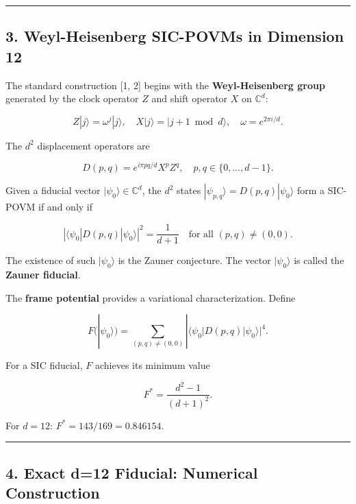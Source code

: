 \begin{center}\rule{0.5\linewidth}{0.5pt}\end{center}

\hypertarget{weyl-heisenberg-sic-povms-in-dimension-12}{%
\subsection{3. Weyl-Heisenberg SIC-POVMs in Dimension
12}\label{weyl-heisenberg-sic-povms-in-dimension-12}}

The standard construction {[}1, 2{]} begins with the
\textbf{Weyl-Heisenberg group} generated by the clock operator \(Z\) and
shift operator \(X\) on \(\mathbb{C}^d\):

\[Z|j\rangle = \omega^j |j\rangle, \quad X|j\rangle = |j+1 \bmod d\rangle, \quad \omega = e^{2\pi i/d}.\]

The \(d^2\) displacement operators are

\[D(p,q) = e^{i\pi pq/d} X^p Z^q, \quad p, q \in \{0, \ldots, d-1\}.\]

Given a fiducial vector \(|\psi_0\rangle \in \mathbb{C}^d\), the \(d^2\)
states \(|\psi_{p,q}\rangle = D(p,q)|\psi_0\rangle\) form a SIC-POVM if
and only if

\[|\langle \psi_0 | D(p,q) | \psi_0 \rangle|^2 = \frac{1}{d+1} \quad \text{for all } (p,q) \neq (0,0).\]

The existence of such \(|\psi_0\rangle\) is the Zauner conjecture. The
vector \(|\psi_0\rangle\) is called the \textbf{Zauner fiducial}.

The \textbf{frame potential} provides a variational characterization.
Define

\[F(|\psi_0\rangle) = \sum_{(p,q) \neq (0,0)} |\langle \psi_0 | D(p,q) | \psi_0 \rangle|^4.\]

For a SIC fiducial, \(F\) achieves its minimum value

\[F^* = \frac{d^2 - 1}{(d+1)^2}.\]

For \(d = 12\): \(F^* = 143/169 = 0.846154\).

\begin{center}\rule{0.5\linewidth}{0.5pt}\end{center}

\hypertarget{exact-d12-fiducial-numerical-construction}{%
\subsection{4. Exact d=12 Fiducial: Numerical
Construction}\label{exact-d12-fiducial-numerical-construction}}

